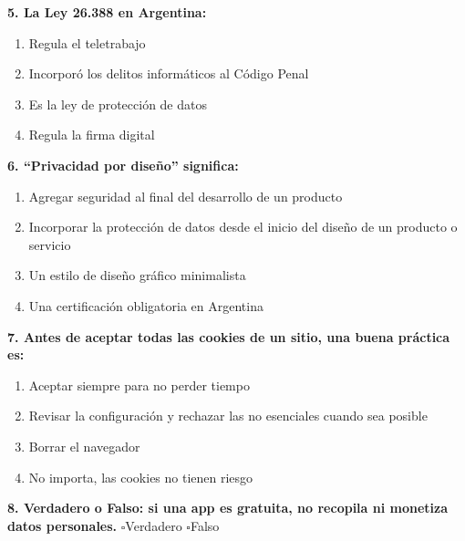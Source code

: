 \documentclass[12pt,a4paper]{article}
\newcommand{\checkboxVacio}{$\square$\;}
\begin{document}
\textbf{5. La Ley 26.388 en Argentina:}
\begin{enumerate}[label=\alph*), leftmargin=2.5em]
  \item Regula el teletrabajo
  \item Incorpor\'o los delitos inform\'aticos al C\'odigo Penal
  \item Es la ley de protecci\'on de datos
  \item Regula la firma digital
\end{enumerate}

\textbf{6. ``Privacidad por dise\~no'' significa:}
\begin{enumerate}[label=\alph*), leftmargin=2.5em]
  \item Agregar seguridad al final del desarrollo de un producto
  \item Incorporar la protecci\'on de datos desde el inicio del dise\~no de un producto o servicio
  \item Un estilo de dise\~no gr\'afico minimalista
  \item Una certificaci\'on obligatoria en Argentina
\end{enumerate}

\textbf{7. Antes de aceptar todas las cookies de un sitio, una buena pr\'actica es:}
\begin{enumerate}[label=\alph*), leftmargin=2.5em]
  \item Aceptar siempre para no perder tiempo
  \item Revisar la configuraci\'on y rechazar las no esenciales cuando sea posible
  \item Borrar el navegador
  \item No importa, las cookies no tienen riesgo
\end{enumerate}

\textbf{8. Verdadero o Falso: si una app es gratuita, no recopila ni monetiza datos personales.}
\vspace{4pt}
\checkboxVacio Verdadero \qquad \checkboxVacio Falso
\end{document}
